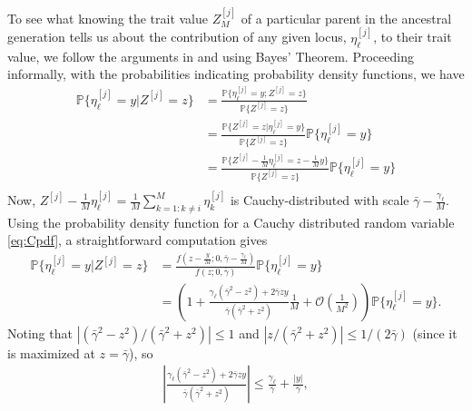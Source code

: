 \documentclass{article}
\renewcommand{\P}{\mathbb{P}}
\newcommand{\1}{\mathbbm{1}}
\newcommand{\Oh}{{\mathcal O}}
\theoremstyle{remark}
\theoremstyle{definition}
\begin{document}
To see what knowing the trait value $Z^{[j]}_{M}$ 
of a particular parent in the ancestral generation
tells us about the contribution of any given locus, $\eta^{[j]}_{\ell}$, to their trait value,
we follow the arguments in  \citet{Fisher1918} and \citet{barton2017infinitesimal} using Bayes' Theorem.
Proceeding informally, with the probabilities indicating probability density functions, we have 
\begin{align*}
    \P\{\eta^{[j]}_{\ell} = y \vert Z^{[j]} = z\} &= \frac{\P\{\eta^{[j]}_{\ell} = y; Z^{[j]} = z\}}{\P\{Z^{[j]} = z\}}\\
        &= \frac{\P\{Z^{[j]} = z\vert\eta^{[j]}_{\ell} = y\}}{\P\{Z^{[j]} = z\}}\P\{\eta^{[j]}_{\ell} = y\}\\
        &=  \frac{\P\{Z^{[j]} -\frac{1}{M} \eta^{[j]}_{\ell} = z - \frac{1}{M} y\}}{\P\{Z^{[j]} = z\}}\P\{\eta^{[j]}_{\ell} = y\}\\
\end{align*}
Now, $Z^{[j]} -\frac{1}{M} \eta^{[j]}_{\ell} = \frac{1}{M} \sum_{k = 1 : k \neq i}^{M} \eta^{[j]}_{k}$ is Cauchy-distributed with scale $\bar{\gamma} - \frac{\gamma_{\ell}}{M}$.  Using the probability density function for a Cauchy distributed random variable \eqref{eq:Cpdf}, a straightforward computation gives
\begin{align*}
    \P\{\eta^{[j]}_{\ell} = y \vert Z^{[j]} = z\}
    &=
    \frac{f\left(z - \frac{y}{M} ;0,\bar{\gamma}-\frac{\gamma_{\ell}}{M}\right)}{f(z;0,\bar{\gamma})} \P\{\eta^{[j]}_{\ell} = y\}\\
    &=
    \left(1
        +
        \frac{\gamma_{\ell}(\bar{\gamma}^{2}-z^{2})+2\bar{\gamma} zy}{\bar{\gamma}(\bar{\gamma}^{2}+z^{2})}
        \frac{1}{M}
        + \Oh\left(\frac{1}{M^{2}}\right)\right)
        \P\{\eta^{[j]}_{\ell} = y\}.
\end{align*}
Noting that $|(\bar{\gamma}^2 - z^2)/(\bar{\gamma}^2 + z^2)| \le 1$
and $|z/(\bar{\gamma}^2 + z^2)| \le 1/(2 \bar{\gamma})$
(since it is maximized at $z = \bar{\gamma}$),
so
\begin{align*}
        \left|
        \frac{\gamma_{\ell}(\bar{\gamma}^{2}-z^{2})+2\bar{\gamma}zy}{\bar{\gamma}(\bar{\gamma}^{2}+z^{2})}
        \right|
        \le \frac{\gamma_{\ell}}{\bar{\gamma}} + \frac{|y|}{\bar{\gamma}},
\end{align*}
\end{document}
